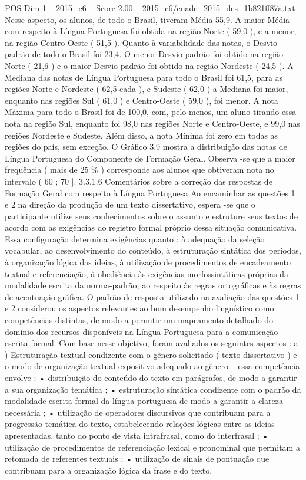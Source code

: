 \begin{textsample}{POS Dim 1 – 2015\_c6 – Score 2.00 – 2015\_c6/enade\_2015\_des\_1b821ff87a.txt}
Nesse aspecto, os alunos, de todo o Brasil, tiveram Média 55,9.
A maior Média com respeito à Língua Portuguesa foi obtida na região Norte ( 59,0 ), e a menor, na região Centro-Oeste ( 51,5 ).
Quanto à variabilidade das notas, o Desvio padrão de todo o Brasil foi 23,4.
O menor Desvio padrão foi obtido na região Norte ( 21,6 ) e o maior Desvio padrão foi obtido na região Nordeste ( 24,5 ).
A Mediana das notas de Língua Portuguesa para todo o Brasil foi 61,5, para as regiões Norte e Nordeste ( 62,5 cada ), e Sudeste ( 62,0 ) a Mediana foi maior, enquanto nas regiões Sul ( 61,0 ) e Centro-Oeste ( 59,0 ), foi menor.
A nota Máxima para todo o Brasil foi de 100,0, com, pelo menos, um aluno tirando essa nota na região Sul, enquanto foi 98,0 nas regiões Norte e Centro-Oeste, e 99,0 nas regiões Nordeste e Sudeste.
Além disso, a nota Mínima foi zero em todas as regiões do país, sem exceção.
O Gráfico 3.9 mostra a distribuição das notas de Língua Portuguesa do Componente de Formação Geral.
Observa -se que a maior frequência ( mais de 25 \% ) corresponde aos alunos que obtiveram nota no intervalo ( 60 ; 70 ]. 3.3.1.6 Comentários sobre a correção das respostas de Formação Geral com respeito à Língua Portuguesa Ao encaminhar as questões 1 e 2 na direção da produção de um texto dissertativo, espera -se que o participante utilize seus conhecimentos sobre o assunto e estruture seus textos de acordo com as exigências do registro formal próprio dessa situação comunicativa.
Essa configuração determina exigências quanto : à adequação da seleção vocabular, ao desenvolvimento do conteúdo, à estruturação sintática dos períodos, à organização lógica das ideias, à utilização de procedimentos de encadeamento textual e referenciação, à obediência às exigências morfossintáticas próprias da modalidade escrita da norma-padrão, ao respeito às regras ortográficas e às regras de acentuação gráfica.
O padrão de resposta utilizado na avaliação das questões 1 e 2 considerou os aspectos relevantes ao bom desempenho linguístico como competências distintas, de modo a permitir um mapeamento detalhado do domínio dos recursos disponíveis na Língua Portuguesa para a comunicação escrita formal.
Com base nesse objetivo, foram avaliados os seguintes aspectos : a ) Estruturação textual condizente com o gênero solicitado ( texto dissertativo ) e o modo de organização textual expositivo adequado ao gênero – essa competência envolve : • distribuição do conteúdo do texto em parágrafos, de modo a garantir a sua organização temática ; • estruturação sintática condizente com o padrão da modalidade escrita formal da língua portuguesa de modo a garantir a clareza necessária ; • utilização de operadores discursivos que contribuam para a progressão temática do texto, estabelecendo relações lógicas entre as ideias apresentadas, tanto do ponto de vista intrafrasal, como do interfrasal ; • utilização de procedimentos de referenciação lexical e pronominal que permitam a retomada de referentes textuais ; • utilização de sinais de pontuação que contribuam para a organização lógica da frase e do texto.

\end{textsample}
